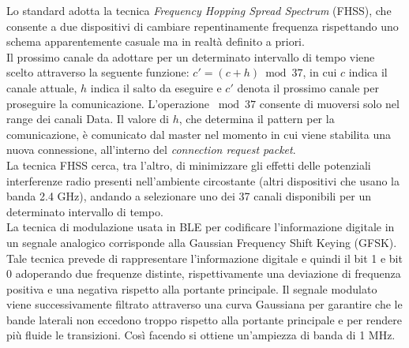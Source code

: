 \noindent Lo standard adotta la tecnica \textit{Frequency Hopping Spread Spectrum} (FHSS), che consente a due dispositivi di cambiare repentinamente frequenza rispettando uno schema apparentemente casuale ma in realtà definito a priori. \\
Il prossimo canale da adottare per un determinato intervallo di tempo viene scelto attraverso la seguente funzione: $ c'=(c+h) \bmod{37}$, in cui $c$ indica il canale attuale, $h$ indica il salto da eseguire e $c'$ denota il prossimo canale per proseguire la comunicazione. L'operazione $\bmod{37}$ consente di muoversi solo nel range dei canali Data. Il valore di $h$, che determina il pattern per la comunicazione, è comunicato dal master nel momento in cui viene stabilita una nuova connessione, all'interno del \textit{connection request packet}.\\
La tecnica FHSS cerca, tra l'altro, di minimizzare gli effetti delle potenziali interferenze radio presenti nell'ambiente circostante (altri dispositivi che usano la banda 2.4 GHz), andando a selezionare uno dei 37 canali disponibili per un determinato intervallo di tempo.\\

\noindent La tecnica di modulazione usata in BLE per codificare l'informazione digitale in un segnale analogico corrisponde alla Gaussian Frequency Shift Keying (GFSK).
Tale tecnica prevede di rappresentare l'informazione digitale e quindi il bit 1 e bit 0 adoperando due frequenze distinte, rispettivamente una deviazione di frequenza positiva e una negativa rispetto alla portante principale. Il segnale modulato viene successivamente filtrato attraverso una curva Gaussiana per garantire che le bande laterali non eccedono troppo rispetto alla portante principale e per rendere più fluide le transizioni. Così facendo si ottiene un'ampiezza di banda di 1 MHz.\\

